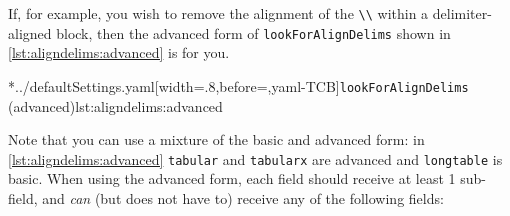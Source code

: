 	If, for example, you wish to remove the alignment of the \lstinline!\\! within a
	delimiter-aligned block, then the advanced form of \texttt{lookForAlignDelims} shown in
	\cref{lst:aligndelims:advanced} is for you.

	\cmhlistingsfromfile[style=lookForAlignDelims]*{../defaultSettings.yaml}[width=.8\linewidth,before=\centering,yaml-TCB]{\texttt{lookForAlignDelims} (advanced)}{lst:aligndelims:advanced}

	Note that you can use a mixture of the basic and advanced form: in
	\cref{lst:aligndelims:advanced} \texttt{tabular} and \texttt{tabularx} are advanced
	and \texttt{longtable} is basic. When using the advanced form, each field should
	receive at least 1 sub-field, and \emph{can}
	(but does not have to) receive any of the following
	fields:
